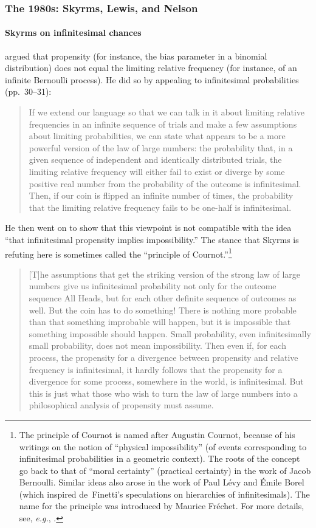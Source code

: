 \subsubsection*{The 1980s: Skyrms, Lewis, and Nelson}

\paragraph{Skyrms on infinitesimal chances}
\citet{Skyrms:1980} argued that propensity (for instance, the bias parameter in a binomial distribution) does not equal the limiting relative frequency (for instance, of an infinite Bernoulli process). He did so by appealing to infinitesimal probabilities (pp.~30--31):
\begin{quote}
If we extend our language so that we can talk in it about limiting relative frequencies in an infinite sequence of trials and make a few assumptions about limiting probabilities, we can state what appears to be a more powerful version of the law of large numbers: the probability that, in a given sequence of independent and identically distributed trials, the limiting relative frequency will either fail to exist or diverge by some positive real number from the probability of the outcome is infinitesimal. Then, if our coin is flipped an infinite number of times, the probability that the limiting relative frequency fails to be one-half is infinitesimal.
\end{quote}
He then went on to show that this viewpoint is not compatible with the idea ``that infinitesimal propensity implies impossibility.'' The stance that Skyrms is refuting here is sometimes called the ``principle of Cournot.''\footnote{\label{fn:Cournot}The principle of Cournot is named after Augustin Cournot, because of his writings on the notion of ``physical impossibility'' (of events corresponding to infinitesimal probabilities in a geometric context). The roots of the concept go back to that of ``moral certainty'' (practical certainty) in the work of Jacob Bernoulli. Similar ideas also arose in the work of Paul L{\'e}vy and {\'E}mile Borel (which inspired de~Finetti's speculations on hierarchies of infinitesimals). The name for the principle was introduced by Maurice Fr{\'e}chet. For more details, see, \textit{e.g.}, \citet{Shafer:2008}.}
\begin{quote}
[T]he assumptions that get the striking version of the strong law of large numbers give us infinitesimal probability not only for the outcome sequence All Heads, but for each other definite sequence of outcomes as well. But the coin has to do something! There is nothing more probable than that something improbable will happen, but it is impossible that something impossible should happen. Small probability, even infinitesimally small probability, does not mean impossibility. Then even if, for each process, the propensity for a divergence between propensity and relative frequency is infinitesimal, it hardly follows that the propensity for a divergence for some process, somewhere in the world, is infinitesimal. But this is just what those who wish to turn the law of large numbers into a philosophical analysis of propensity must assume.
\end{quote}
